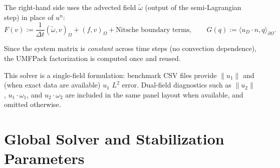 \documentclass[11pt]{article}
\begin{document}
The right-hand side uses the advected field $\tilde\omega$ (output of the
semi-Lagrangian step) in place of $u^n$:
\[
	F(v) := \frac{1}{\Delta t}(\tilde\omega,v)_\Omega + (f,v)_\Omega
	+ \text{Nitsche boundary terms},
	\qquad
	G(q) := \langle u_D\cdot n,q\rangle_{\partial\Omega}.
\]

Since the system matrix is \emph{constant} across time steps (no convection
dependence), the UMFPack factorization is computed once and reused.

This solver is a single-field formulation: benchmark CSV files provide
$\|u_1\|$ and (when exact data are available) $u_1$ $L^2$ error.  Dual-field
diagnostics such as $\|u_2\|$, $u_1\cdot\omega_1$, and $u_2\cdot\omega_2$
are included in the same panel layout when available, and omitted otherwise.

\section*{Global Solver and Stabilization Parameters}
\end{document}

